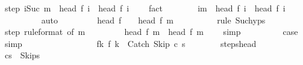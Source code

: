 \begin{isabellebody}
\ step{\isacharcolon}\ {\isachardoublequoteopen}{\isasymforall}i{\isacharless}Suc\ m{\isachardot}\ {\isasymGamma}{\isasymturnstile}\ head\ {\isacharparenleft}f\ i{\isacharparenright}\ {\isasymrightarrow}\ head\ {\isacharparenleft}f\ {\isacharparenleft}i\ {\isacharplus}\ {}{\isacharparenright}{\isacharparenright}{\isachardoublequoteclose}\ \isamarkupfalse%
\ fact\isanewline
\ \ \ \ \ \ \isamarkupfalse%
\ {\isachardoublequoteopen}{\isasymforall}i{\isacharless}m{\isachardot}\ {\isasymGamma}{\isasymturnstile}\ head\ {\isacharparenleft}f\ i{\isacharparenright}\ {\isasymrightarrow}\ head\ {\isacharparenleft}f\ {\isacharparenleft}i\ {\isacharplus}\ {}{\isacharparenright}{\isacharparenright}{\isachardoublequoteclose}\isanewline
\ \ \ \ \ \ \ \ \isamarkupfalse%
\ auto\isanewline
\ \ \ \ \ \ \isamarkupfalse%
\ {\isachardoublequoteopen}{\isasymGamma}{\isasymturnstile}\ head\ {\isacharparenleft}f\ {}{\isacharparenright}\ {\isasymrightarrow}\isactrlsup {\isacharasterisk}\ \ head\ {\isacharparenleft}f\ m{\isacharparenright}{\isachardoublequoteclose}\isanewline
\ \ \ \ \ \ \ \ \isamarkupfalse%
\ {\isacharparenleft}rule\ Suc{\isachardot}hyps{\isacharparenright}\isanewline
\ \ \ \ \ \ \isamarkupfalse%
\ \isamarkupfalse%
\ step\ {\isacharbrackleft}rule{\isacharunderscore}format{\isacharcomma}\ of\ m{\isacharbrackright}\isanewline
\ \ \ \ \ \ \isamarkupfalse%
\ {\isachardoublequoteopen}{\isasymGamma}{\isasymturnstile}\ head\ {\isacharparenleft}f\ m{\isacharparenright}\ {\isasymrightarrow}\ head\ {\isacharparenleft}f\ {\isacharparenleft}m\ {\isacharplus}\ {}{\isacharparenright}{\isacharparenright}{\isachardoublequoteclose}\ \isamarkupfalse%
\ simp\isanewline
\ \ \ \ \ \ \isamarkupfalse%
\ \isamarkupfalse%
\ {\isacharquery}case\ \isamarkupfalse%
\ simp\isanewline
\ \ \ \ \isamarkupfalse%
\isanewline
\ \ \ \ \isacommand{{\isacharbraceleft}}\isamarkupfalse%
\isanewline
\ \ \ \ \ \ \isamarkupfalse%
\ f{\isacharunderscore}k{\isacharcolon}\ {\isachardoublequoteopen}f\ k\ {\isacharequal}\ {\isacharparenleft}Catch\ Skip\ c\ s{\isacharprime}{\isacharparenright}{\isachardoublequoteclose}\isanewline
\ \ \ \ \ \ \isamarkupfalse%
\ steps{\isacharunderscore}head\isanewline
\ \ \ \ \ \ \isamarkupfalse%
\ {\isachardoublequoteopen}{\isasymGamma}{\isasymturnstile}{\isacharparenleft}cs{\isacharparenright}\ {\isasymrightarrow}\isactrlsup {\isacharasterisk}\ {\isacharparenleft}Skip{\isacharcomma}s{\isacharprime}{\isacharparenright}{\isachardoublequoteclose}\isanewline

\end{isabellebody}
